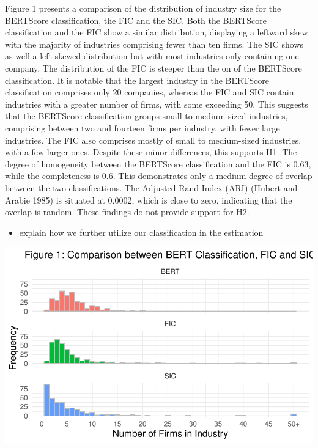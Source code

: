 \documentclass[
]{article}
\providecommand{\tightlist}{%
  \setlength{\itemsep}{0pt}\setlength{\parskip}{0pt}}\usepackage{longtable,booktabs,array}
\begin{document}
Figure 1 presents a comparison of the distribution of industry size for
the BERTScore classification, the FIC and the SIC. Both the BERTScore
classification and the FIC show a similar distribution, displaying a
leftward skew with the majority of industries comprising fewer than ten
firms. The SIC shows as well a left skewed distribution but with most
industries only containing one company. The distribution of the FIC is
steeper than the on of the BERTScore classification. It is notable that
the largest industry in the BERTScore classification comprises only 20
companies, whereas the FIC and SIC contain industries with a greater
number of firms, with some exceeding 50. This suggests that the
BERTScore classification groups small to medium-sized industries,
comprising between two and fourteen firms per industry, with fewer large
industries. The FIC also comprises mostly of small to medium-sized
industries, with a few larger ones. Despite these minor differences,
this supports H1. The degree of homogeneity between the BERTScore
classification and the FIC is 0.63, while the completeness is 0.6. This
demonstrates only a medium degree of overlap between the two
classifications. The Adjusted Rand Index (ARI) (Hubert and Arabie 1985)
is situated at 0.0002, which is close to zero, indicating that the
overlap is random. These findings do not provide support for H2.

\begin{itemize}
\tightlist
\item
  explain how we further utilize our classification in the estimation
\end{itemize}

\includegraphics{ProjectEcoDataScience_files/figure-pdf/unnamed-chunk-5-1.pdf}
\end{document}
